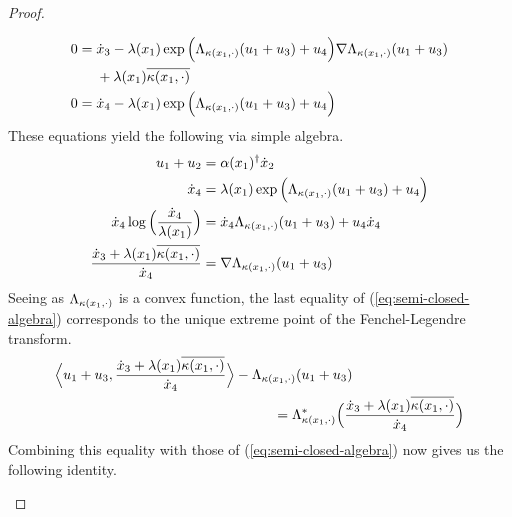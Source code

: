 \begin{proof}
\begin{enumerate}
\begin{align*}
        0 &= \begin{aligned}[t]
          &\dot{x}_3 - \lambda(x_1) \exp\Big( \Lambda_{\kappa(x_1,\cdot)}(u_1+u_3) + u_4\Big) \nabla\Lambda_{\kappa(x_1,\cdot)}(u_1+u_3) \\
          &+ \lambda(x_1) \overline{\kappa(x_1, \cdot)} 
        \end{aligned} \\
        0 &= \dot{x}_4 - \lambda(x_1) \exp\Big( \Lambda_{\kappa(x_1,\cdot)}(u_1+u_3) + u_4\Big) 
      \end{align*}
      These equations yield the following via simple algebra.
      \begin{equation}
        \label{eq:semi-closed-algebra}
        \begin{aligned}
          u_1 + u_2 &= \alpha(x_1)^\dagger \dot{x}_2 \\
          \dot{x}_4 &= \lambda(x_1) \exp\Big( \Lambda_{\kappa(x_1,\cdot)}(u_1+u_3) + u_4\Big)  \\
          \dot{x}_4\log\Big(\frac{\dot{x}_4}{\lambda(x_1)}\Big) &=   \dot{x}_4\Lambda_{\kappa(x_1,\cdot)}(u_1+u_3) + u_4\dot{x}_4 \\
          \frac{\dot{x}_3 + \lambda(x_1)\overline{\kappa(x_1,\cdot)}}{\dot{x}_4} &= \nabla\Lambda_{\kappa(x_1,\cdot)}(u_1+u_3)
        \end{aligned}
      \end{equation}
      Seeing as $\Lambda_{\kappa(x_1,\cdot)}$ is a convex function, the last equality of (\ref{eq:semi-closed-algebra}) corresponds to the unique extreme point of the Fenchel-Legendre transform.
      \begin{align*}
        &\Bprj{\momentVar_1 + \momentVar_3}{\frac{\diffVar_3+\affInt(\stateVar_1)\overline{\affDist(\stateVar_1,\cdot)}}{\diffVar_4}} - \ode_{\affDist(\stateVar_1,\cdot)}(\momentVar_1+\momentVar_3) \\
        &\hspace{55mm}= \ode_{\affDist(\stateVar_1,\cdot)}^*\Big(\frac{\diffVar_3+\affInt(\stateVar_1)\overline{\affDist(\stateVar_1,\cdot)}}{\diffVar_4}\Big)
      \end{align*}
      Combining this equality with those of (\ref{eq:semi-closed-algebra}) now gives us the following identity.

\end{enumerate}
\end{proof}

